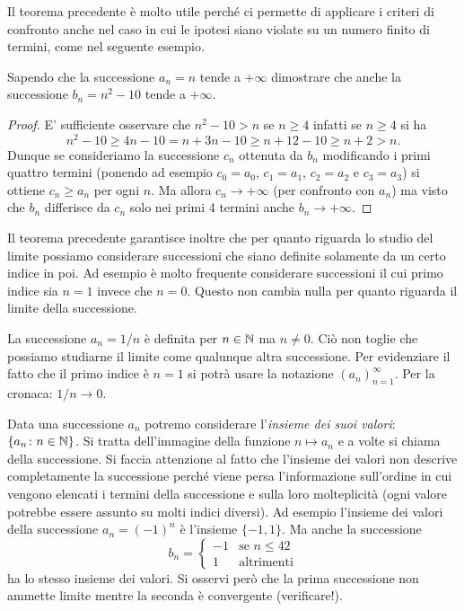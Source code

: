 Il teorema precedente è molto utile perché ci permette di applicare
i criteri di confronto anche nel caso in cui le ipotesi siano violate
su un numero finito di termini, come nel seguente esempio.

\begin{example}
Sapendo che la successione $a_n = n$ tende a $+\infty$ dimostrare
che anche la successione $b_n = n^2-10$ tende a $+\infty$.
\end{example}
%
\begin{proof}
E' sufficiente osservare che $n^2-10 > n$ se $n\ge 4$ infatti
se $n\ge 4$ si ha
\[
n^2 - 10 \ge 4 n -10 = n + 3n - 10 \ge n + 12 -10 \ge n+2 > n.
\]
Dunque se consideriamo la successione $c_n$ ottenuta da $b_n$
modificando i primi quattro termini (ponendo ad esempio $c_0 = a_0$,
$c_1=a_1$, $c_2=a_2$ e $c_3=a_3$) si ottiene $c_n\ge a_n$ per ogni $n$.
Ma allora $c_n \to +\infty$ (per confronto con $a_n$) ma visto che
$b_n$ differisce da $c_n$ solo nei primi 4 termini anche $b_n\to +\infty$.
\end{proof}

Il teorema precedente garantisce inoltre
che per quanto riguarda lo studio del limite possiamo considerare
successioni che siano definite solamente da un certo indice in poi.
Ad esempio è molto frequente considerare successioni il cui primo indice sia
$n=1$ invece che $n=0$. Questo non cambia nulla per quanto riguarda il limite
della successione.

\begin{example}
La successione $a_n = 1/n$ è definita per $n\in \mathbb N$ ma $n\neq 0$.
Ciò non toglie che possiamo studiarne il limite come qualunque altra
successione. Per evidenziare il fatto che il primo indice è $n=1$
si potrà usare la notazione $(a_n)_{n=1}^\infty$.
Per la cronaca: $1/n \to 0$.
\end{example}

Data una successione $a_n$ potremo considerare l'\emph{insieme
dei suoi valori}: $\{a_n\colon n\in \mathbb N\}$.
Si tratta dell'immagine della funzione $n\mapsto a_n$
e a volte si chiama  della successione.
Si faccia attenzione al fatto che l'insieme dei valori
non descrive completamente la successione perché
viene persa l'informazione sull'ordine in cui vengono elencati
i termini della successione e sulla loro molteplicità (ogni valore
potrebbe essere assunto su molti indici diversi). Ad esempio
l'insieme dei valori della successione $a_n = (-1)^n$ è l'insieme $\{-1, 1\}$. Ma anche la successione
\[
 b_n = \begin{cases}
   -1 & \text{se $n\le 42$}\\
   1  & \text{altrimenti}
 \end{cases}
\]
ha lo stesso insieme dei valori. Si osservi però
che la prima successione non ammette limite mentre la seconda
è convergente (verificare!).

